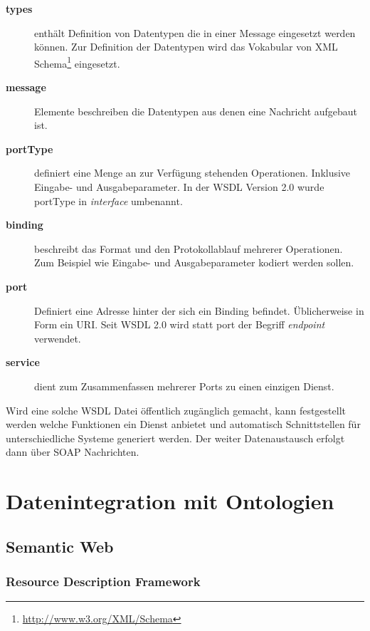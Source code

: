 \begin{description}
    \item[\textbf{types}] enthält Definition von Datentypen die in einer Message eingesetzt werden können. Zur Definition der Datentypen wird das Vokabular von XML Schema\footnote{\url{http://www.w3.org/XML/Schema}} eingesetzt.
    \item[\textbf{message}] Elemente beschreiben die Datentypen aus denen eine Nachricht aufgebaut ist.
    \item[\textbf{portType}] definiert eine Menge an zur Verfügung stehenden Operationen. Inklusive Eingabe- und Ausgabeparameter. In der WSDL Version 2.0 wurde portType in \emph{interface} umbenannt.
    \item[\textbf{binding}] beschreibt das Format und den Protokollablauf mehrerer Operationen. Zum Beispiel wie Eingabe- und Ausgabeparameter kodiert werden sollen. 
    \item[\textbf{port}] Definiert eine Adresse hinter der sich ein Binding befindet. Üblicherweise in Form ein URI. Seit WSDL 2.0 wird statt port der Begriff \emph{endpoint} verwendet.
    \item[\textbf{service}] dient zum Zusammenfassen mehrerer Ports zu einen einzigen Dienst.
\end{description}

Wird eine solche WSDL Datei öffentlich zugänglich gemacht, kann festgestellt werden welche Funktionen ein Dienst anbietet und automatisch Schnittstellen für unterschiedliche Systeme generiert werden. Der weiter Datenaustausch erfolgt dann über SOAP Nachrichten.




\section{Datenintegration mit Ontologien} %
\label{sec:datenintegration_mit_ontologien}



\subsection{Semantic Web} %
\label{sub:semantic_web}


\subsubsection{Resource Description Framework} %
\label{ssub:resource_description_framework}


